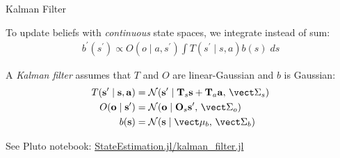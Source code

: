 \begin{frame}[fragile]{Kalman Filter}

To update beliefs with \textit{continuous} state spaces, we integrate instead of sum:
\begin{gather*}
    b^\prime(s^\prime) \propto O(o \mid a, s^\prime)\int T(s^\prime \mid s, a)b(s)\;ds    
\end{gather*}

A \textit{Kalman filter} assumes that $T$ and $O$ are linear-Gaussian and $b$ is Gaussian:
\begin{align*}
    T(\mathbf{s}^\prime \mid \mathbf s, \mathbf a) &= \mathcal{N}(\mathbf{s}^\prime \mid \mathbf{T}_s \mathbf{s} + \mathbf{T}_a \mathbf{a},\, \mat{\Sigma}_s)\\
    O(\mathbf o \mid \mathbf{s}^\prime) &= \mathcal{N}(\mathbf o \mid \mathbf{O}_s \mathbf{s}^\prime,\, \mat{\Sigma}_o)\\
    b(\mathbf{s}) &= \mathcal{N}(\mathbf{s} \mid \vec{\mu}_b,\, \mat{\Sigma}_b)
\end{align*}


See Pluto notebook: \href{http://htmlview.glitch.me/?https://raw.githubusercontent.com/mossr/StateEstimation.jl/master/html/kalman_filter.html}{\color{cardinal}StateEstimation.jl/kalman\_filter.jl}

\end{frame}